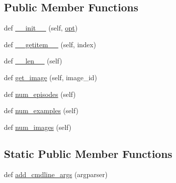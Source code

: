 \subsection*{Public Member Functions}
\begin{DoxyCompactItemize}
\item 
def \hyperlink{classparlai_1_1tasks_1_1personality__captions_1_1agents_1_1DefaultDataset_ad6cd645c8b905614663c2b6a0595fb68}{\+\_\+\+\_\+init\+\_\+\+\_\+} (self, \hyperlink{classparlai_1_1tasks_1_1personality__captions_1_1agents_1_1DefaultDataset_abe6bd53066bf10f26ef80157335cd6b9}{opt})
\item 
def \hyperlink{classparlai_1_1tasks_1_1personality__captions_1_1agents_1_1DefaultDataset_a76d202d337e31250a02f7decdf886b7a}{\+\_\+\+\_\+getitem\+\_\+\+\_\+} (self, index)
\item 
def \hyperlink{classparlai_1_1tasks_1_1personality__captions_1_1agents_1_1DefaultDataset_a8388fab891045bf4c2ac38f8b9fca6e5}{\+\_\+\+\_\+len\+\_\+\+\_\+} (self)
\item 
def \hyperlink{classparlai_1_1tasks_1_1personality__captions_1_1agents_1_1DefaultDataset_a1af0abcddf51525898da67e2e796c525}{get\+\_\+image} (self, image\+\_\+id)
\item 
def \hyperlink{classparlai_1_1tasks_1_1personality__captions_1_1agents_1_1DefaultDataset_a09fb1bf7bf9dc5ab00ef9f32388336ea}{num\+\_\+episodes} (self)
\item 
def \hyperlink{classparlai_1_1tasks_1_1personality__captions_1_1agents_1_1DefaultDataset_a043423c38c701ceadd6fec7cf5168816}{num\+\_\+examples} (self)
\item 
def \hyperlink{classparlai_1_1tasks_1_1personality__captions_1_1agents_1_1DefaultDataset_a47fe8d505cb78e4da24426784b1ff376}{num\+\_\+images} (self)
\end{DoxyCompactItemize}
\subsection*{Static Public Member Functions}
\begin{DoxyCompactItemize}
\item 
def \hyperlink{classparlai_1_1tasks_1_1personality__captions_1_1agents_1_1DefaultDataset_ae81ce7e05c42b214d42a5a4a5c471c8e}{add\+\_\+cmdline\+\_\+args} (argparser)
\end{DoxyCompactItemize}

